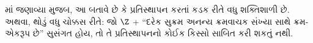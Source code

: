 \documentclass[../../../include/open-logic-section]{subfiles}
\begin{document}
માં જણાવ્યા મુજબ,
આ બતાવે છે કે પ્રતિસ્થાપન
 કરતાં
કડક રીતે વધુ શક્તિશાળી છે. અથવા, થોડું વધુ ચોક્કસ રીતે:
જો $\Z$ + ``દરેક સુક્રમ અનન્ય ક્રમવાચક સંખ્યા સાથે
ક્રમ-એકરૂપ છે'' સુસંગત હોય, તો તે પ્રતિસ્થાપનનો
કોઈક કિસ્સો સાબિત કરી શકતું નથી.



\end{document}
